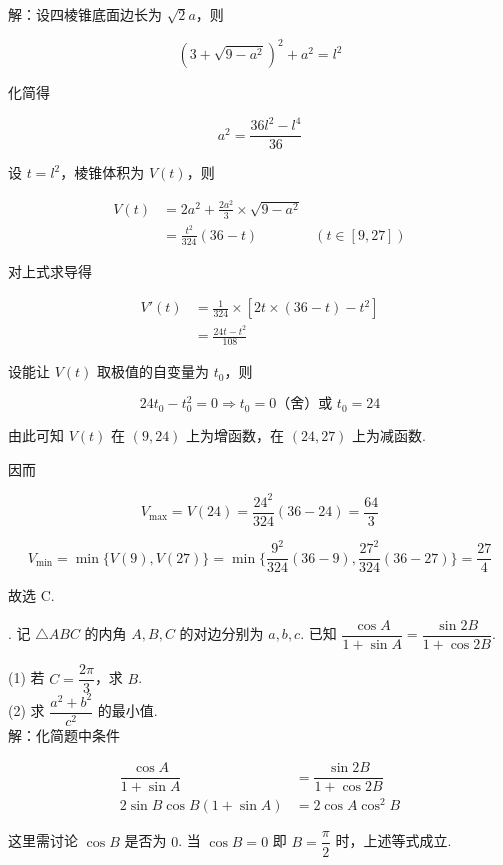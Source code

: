 \documentclass[UTF8]{ctexart}
\begin{document}
\noindent 解：设四棱锥底面边长为 $\sqrt 2a$，则

$$(3+\sqrt{9-a^2})^2+a^2=l^2$$

\noindent 化简得

$$a^2=\frac{36l^2-l^4}{36}$$

\noindent 设 $t=l^2$，棱锥体积为 $V(t)$，则

\begin{align*}
V(t) &= 2a^2+\frac{2a^2}{3} \times \sqrt{9-a^2} \\
&= \frac{t^2}{324}(36-t) \qquad  \qquad (t \in [9,27])
\end{align*}

\noindent 对上式求导得

\begin{align*}
V'(t) &= \frac{1}{324} \times [2t \times (36-t)-t^2] \\ 
&= \frac{24t-t^2}{108}
\end{align*}

\noindent 设能让 $V(t)$ 取极值的自变量为 $t_0$，则

$$24t_0-t_0^2=0 \Rightarrow t_0=0 \text{（舍）或 } t_0=24$$

\noindent 由此可知 $V(t)$ 在 $(9,24)$ 上为增函数，在 $(24,27)$ 上为减函数.

\noindent 因而

$$V_{\max}=V(24)=\frac{24^2}{324}(36-24)=\frac{64}{3}$$

$$V_{\min}=\min\{V(9),V(27)\}=\min\{\frac{9^2}{324}(36-9),\frac{27^2}{324}(36-27)\}=\frac{27}{4}$$

\noindent 故选 C.

\newpage

. 记 $\triangle ABC$ 的内角 $A,B,C$ 的对边分别为 $a,b,c$. 已知 $\dfrac{\cos A}{1+\sin A}=\dfrac{\sin 2B}{1+\cos 2B}$.

\noindent (1) 若 $C=\dfrac{2 \pi}{3}$，求 $B$. \\

\noindent (2) 求 $\dfrac{a^2+b^2}{c^2}$ 的最小值. \\

\noindent 解：化简题中条件

\begin{align*}
\dfrac{\cos A}{1+\sin A} &= \dfrac{\sin 2B}{1+\cos 2B} \\
2 \sin B \cos B(1+ \sin A) &= 2 \cos A \cos ^2 B
\end{align*}

\noindent 这里需讨论 $\cos B$ 是否为 $0$. 当 $\cos B=0$ 即 $B=\dfrac{\pi}{2}$ 时，上述等式成立.
\end{document}
